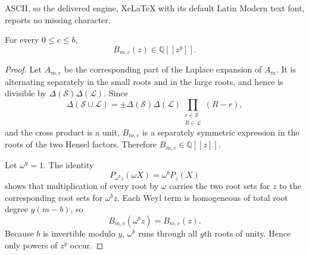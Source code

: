 \documentclass[10pt,a4paper]{amsart}
\newcommand{\Q}{\mathbb{Q}}
\newcommand{\cL}{\mathcal{L}}
\newcommand{\cS}{\mathcal{S}}
\begin{document}
ASCII, so the delivered engine, XeLaTeX with its default Latin Modern text font, reports no missing character.
\begin{lemma}\label{lem:blockregularity}
For every $0\leq c\leq b$,
\begin{equation}\label{eq:blocksupport}
    B_{m,c}(z)\in\Q[[z^y]].
\end{equation}
\end{lemma}

\begin{proof}
Let $A_{m,c}$ be the corresponding part of the Laplace expansion of $A_m$.  It is alternating separately in the small roots and in the large roots, and hence is divisible by $\Delta(\cS)\Delta(\cL)$.  Since
\[
 \Delta(\cS\cup\cL)
 =\pm\Delta(\cS)\Delta(\cL)
   \prod_{\substack{r\in\cS\\R\in\cL}}(R-r),
\]
and the cross product is a unit, $B_{m,c}$ is a separately symmetric expression in the roots of the two Hensel factors.  Therefore $B_{m,c}\in\Q[[z]]$.

Let $\omega^y=1$.  The identity
\[
    P_{\omega^b z}(\omega X)=\omega^bP_z(X)
\]
shows that multiplication of every root by $\omega$ carries the two root sets for $z$ to the corresponding root sets for $\omega^b z$.  Each Weyl term is homogeneous of total root degree $y(m-b)$, so
\[
    B_{m,c}(\omega^b z)=B_{m,c}(z).
\]
Because $b$ is invertible modulo $y$, $\omega^b$ runs through all $y$th roots of unity.  Hence only powers of $z^y$ occur.
\end{proof}
\end{document}

